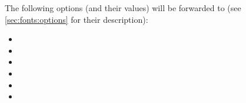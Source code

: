 The following options (and their values) will be forwarded to 
(see \autoref{sec:fonts:options} for their description):
\begin{itemize}
  \item {}
  \item {}
  \item {}
  \item {}
  \item {}
  \item {}
\end{itemize}
